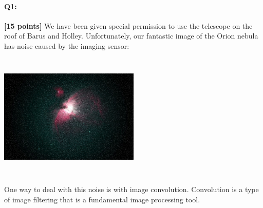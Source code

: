 \documentclass[11pt]{article}
\begin{document}
\pagebreak

\paragraph{Q1:} \textbf{[15 points]} We have been given special permission to use the telescope on the roof of Barus and Holley. Unfortunately, our fantastic image of the Orion nebula has noise caused by the imaging sensor:

\includegraphics[width=0.5\textwidth,height=6cm,keepaspectratio]
{images/orion-noise.png}

One way to deal with this noise is with image convolution. Convolution is a type of image filtering that is a fundamental image processing tool.
\end{document}
